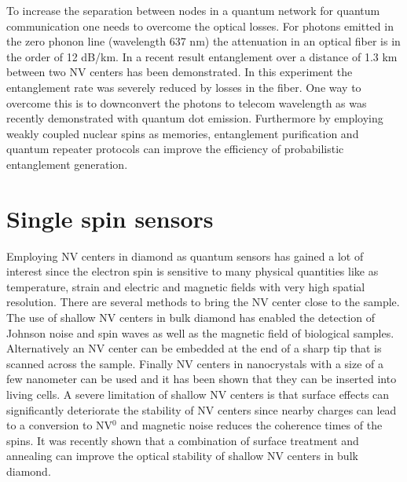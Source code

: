To increase the separation between nodes in a quantum network for quantum communication one needs to overcome the optical losses. For photons emitted in the zero phonon line (wavelength 637 nm) the attenuation in an optical fiber is in the order of 12 dB/km. In a recent result entanglement over a distance of 1.3 km between two NV centers has been demonstrated\cite{Hensen_arXiv_2015}. In this experiment the entanglement rate was severely reduced by losses in the fiber. One way to overcome this is to downconvert the photons to telecom wavelength as was recently demonstrated with quantum dot emission\cite{DeGreve_Nature_2012,Zaske_Phys.Rev.Lett._2012}. Furthermore by employing weakly coupled nuclear spins as memories, entanglement purification\cite{Campbell_Phys.Rev.Lett._2008} and quantum repeater protocols\cite{Briegel_Phys.Rev.Lett._1998} can improve the efficiency of probabilistic entanglement generation.

\section{Single spin sensors}
Employing NV centers in diamond as quantum sensors \cite{Taylor_NatPhys_2008,Schirhagl__2014} has gained a lot of interest since the electron spin is sensitive to many physical quantities like as temperature\cite{Acosta_Phys.Rev.Lett._2010,Toyli_PNAS_2013}, strain\cite{Ovartchaiyapong_NatCommun_2014} and electric and magnetic fields\cite{Taylor_NatPhys_2008,Dolde_NatPhys_2011} with very high spatial resolution. There are several methods to bring the NV center close to the sample. The use of shallow NV centers in bulk diamond has enabled the detection of Johnson noise\cite{Kolkowitz_Science_2015} and spin waves\cite{vanderSar_NatCommun_2015} as well as the magnetic field of biological samples\cite{LeSage_Nature_2013}. Alternatively an NV center can be embedded at the end of a sharp tip that is scanned across the sample\cite{Balasubramanian_Nature_2008,Maletinsky_NatNano_2012,Rondin__2012,Pelliccione_Phys.Rev.Applied_2014,Haberle_NatNano_2015}. Finally NV centers in  nanocrystals with a size of a few nanometer can be used and it has been shown that they can be inserted into living cells\cite{Kucsko_Nature_2013}. A severe limitation of shallow NV centers is that surface effects can significantly deteriorate the stability of NV centers since nearby charges can lead to a conversion to NV$^0$ and magnetic noise reduces the coherence times of the spins. It was recently shown that a combination of surface treatment and annealing can improve the optical stability of shallow NV centers in bulk diamond\cite{Chu_NanoLett._2014}.

